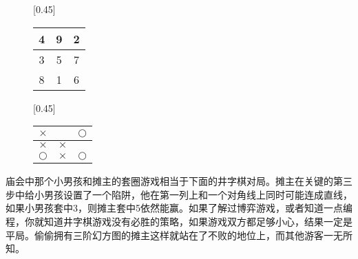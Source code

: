 \documentclass[UTF8]{article}
\begin{document}
\begin{figure}[htbp]
 \centering
 [0.45\linewidth]{
   \begin{tabular}{|c|c|c|}
   \hline
   4 & 9 & 2 \\
   \hline
   3 & 5 & 7 \\
   \hline
   8 & 1 & 6 \\
   \hline
   \end{tabular}
   \vspace{3mm}
 }
 [0.45\linewidth]{
   \begin{tabular}{c|c|c}
   $\times$ &  & $\bigcirc$ \\
   \hline
   $\times$ & $\times$ &  \\
   \hline
   $\bigcirc$ & $\times$ & $\bigcirc$ \\
   \end{tabular}
   \vspace{3mm}
 }
 \captionsetup{labelformat=empty}
 \caption{}
 \label{fig:bingo-magic-square}
\end{figure}

庙会中那个小男孩和摊主的套圈游戏相当于下面的井字棋对局。摊主在关键的第三步中给小男孩设置了一个陷阱，他在第一列上和一个对角线上同时可能连成直线，如果小男孩套中3，则摊主套中5依然能赢。如果了解过博弈游戏，或者知道一点编程，你就知道井字棋游戏没有必胜的策略，如果游戏双方都足够小心，结果一定是平局。偷偷拥有三阶幻方图的摊主这样就站在了不败的地位上，而其他游客一无所知。
\end{document}
